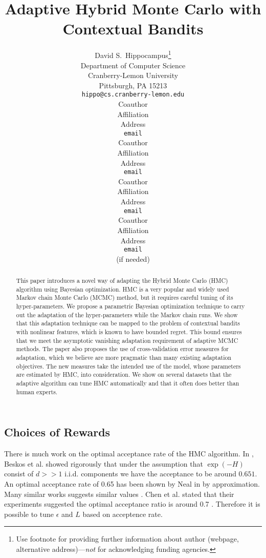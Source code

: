\documentclass{article} %
\title{Adaptive Hybrid Monte Carlo with Contextual Bandits}
\author{
David S.~Hippocampus\thanks{ Use footnote for providing further information
about author (webpage, alternative address)---\emph{not} for acknowledging
funding agencies.} \\
Department of Computer Science\\
Cranberry-Lemon University\\
Pittsburgh, PA 15213 \\
\texttt{hippo@cs.cranberry-lemon.edu} \\
\And
Coauthor \\
Affiliation \\
Address \\
\texttt{email} \\
\AND
Coauthor \\
Affiliation \\
Address \\
\texttt{email} \\
\And
Coauthor \\
Affiliation \\
Address \\
\texttt{email} \\
\And
Coauthor \\
Affiliation \\
Address \\
\texttt{email} \\
(if needed)\\
}
\begin{document}
\maketitle

\begin{abstract}
This paper introduces a novel way of adapting the Hybrid Monte Carlo (HMC) algorithm using Bayesian optimization. 
HMC is a very popular and widely used Markov chain Monte Carlo (MCMC) method, but it requires careful tuning of its hyper-parameters. We propose a parametric Bayesian optimization technique to carry out the adaptation of the hyper-parameters while the Markov chain runs. We show that this adaptation technique can be mapped to the problem of contextual bandits with nonlinear features, which is known to have bounded regret. This bound ensures that we meet the asymptotic vanishing adaptation requirement of adaptive MCMC methods. The paper also proposes the use of cross-validation error measures for adaptation, which we believe are more pragmatic than many existing adaptation objectives. The new measures take the intended use of the model, whose parameters are estimated by HMC, into consideration. We show on several datasets that the adaptive algorithm can tune HMC automatically and that it often does better than human experts.
\end{abstract}








\subsection{Choices of Rewards}
There is much work on the optimal acceptance rate of the HMC algorithm. In \cite{beskos2010optimal}, Beskos et al. showed rigorously that under the assumption that $\exp(-H)$ consist of $d >> 1$ i.i.d. components we have the acceptance to be around $0.651$. An optimal acceptance rate of 0.65 has been shown by Neal in \cite{neal2010mcmc} by approximation. Many similar works suggests similar values \cite{creutz1988global} \cite{sexton1992hamiltonian} \cite{kennedy1991acceptances}. Chen et al. stated that their experiments suggested the optimal acceptance ratio is around 0.7 \cite{chen2001exploring}. Therefore it is possible to tune $\epsilon$ and $L$ based on acceptence rate.





\small{
{}

}
\end{document}
